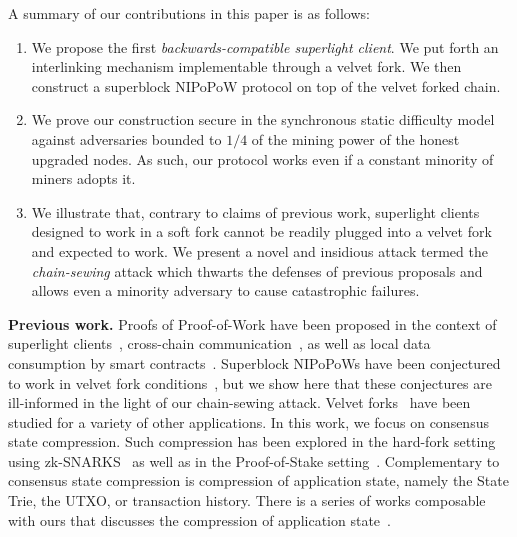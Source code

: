 A summary of our contributions in this paper is as follows:

\begin{enumerate}
  \item We propose the first \emph{backwards-compatible superlight client}. We
        put forth an interlinking mechanism implementable through a velvet fork.
        We then construct a superblock NIPoPoW protocol on top of the velvet
        forked chain.
  \item We prove our construction secure in the synchronous static difficulty
        model against adversaries bounded to $1/4$ of the mining power of the
        honest upgraded nodes. As such, our protocol works even if a constant
        minority of miners adopts it.
  \item We illustrate that, contrary to claims of previous work, superlight
        clients designed to work in a soft fork cannot be readily plugged into a
        velvet fork and expected to work. We present a novel and insidious
        attack termed the \emph{chain-sewing} attack which thwarts the defenses
        of previous proposals and allows even a minority adversary to cause
        catastrophic failures.
\end{enumerate}

\textbf{Previous work.} Proofs of Proof-of-Work have been proposed in the
context of superlight clients~\cite{pow,nipopows,flyclient},
cross-chain communication~\cite{pow-sidechains,burn,crosschain-sok}, as well as
local data consumption by smart contracts~\cite{derivatives}. Superblock
NIPoPoWs have been conjectured to work in velvet fork
conditions~\cite{nipopows}, but we show here that these conjectures are
ill-informed in the light of our chain-sewing attack. Velvet forks~\cite{velvet}
have been studied for a variety of other applications. In this work, we focus on
consensus state compression. Such compression has been explored in the hard-fork
setting using zk-SNARKS~\cite{coda} as well as in the Proof-of-Stake
setting~\cite{pos-sidechains}. Complementary to consensus state compression is
compression of application state, namely the State Trie, the UTXO, or
transaction history. There is a series of works composable with ours that
discusses the compression of application state~\cite{edrax,ethanos}.

